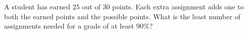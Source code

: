 A student has earned $25$ out of $30$ points. Each extra assignment adds one to both the earned points and the possible points. What is the least number of assignments needed for a grade of at least $90\%$?
